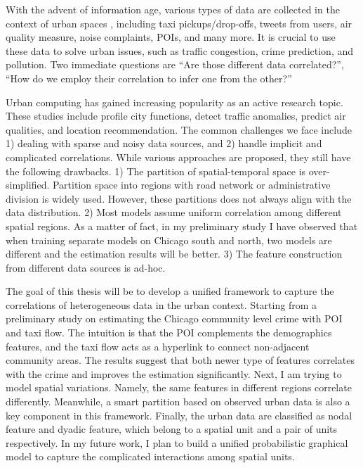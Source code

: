 With the advent of information age, various types of data are collected in the context of urban spaces , including taxi pickups/drop-offs, tweets from users, air quality measure, noise complaints, POIs, and many more. It is crucial to use these data to solve urban issues, such as traffic congestion, crime prediction, and pollution. Two immediate questions are ``Are those different data correlated?'', ``How do we employ their correlation to infer one from the other?''

Urban computing has gained increasing popularity as an active research topic. These studies include profile city functions, detect traffic anomalies, predict air qualities, and location recommendation. The common challenges we face include 1) dealing with sparse and noisy data sources, and 2) handle implicit and complicated correlations. While various approaches are proposed, they still have the following drawbacks. 1) The partition of spatial-temporal space is over-simplified. Partition space into regions with road network or administrative division is widely used. However, these partitions does not always align with the data distribution. 2) Most models assume uniform correlation among different spatial regions. As a matter of fact, in my preliminary study I have observed that when training separate models on Chicago south and north, two models are different and the estimation results will be better. 3) The feature construction from different data sources is ad-hoc.

The goal of this thesis will be to develop a unified framework to capture the correlations of heterogeneous data in the urban context. Starting from a preliminary study on estimating the Chicago community level crime with POI and taxi flow. The intuition is that the POI complements the demographics features, and the taxi flow acts as a hyperlink to connect non-adjacent community areas. The results suggest that both newer type of features correlates with the crime and improves the estimation significantly. Next, I am trying to model spatial variations. Namely, the same features in different regions correlate differently. Meanwhile, a smart partition based on observed urban data is also a key component in this framework. Finally, the urban data are classified as nodal feature and dyadic feature, which belong to a spatial unit and a pair of units respectively. In my future work, I plan to build a unified probabilistic graphical model to capture the complicated interactions among spatial units.
